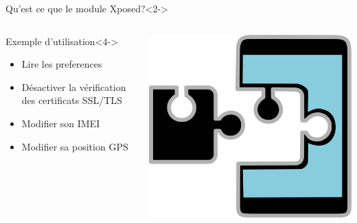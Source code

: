 \documentclass[aspectratio=1610, ]{beamer}%
\begin{document}
  \begin{frame}[t]
    \slidetitle[Xposed]
    \begin{block}{Qu'est ce que le module Xposed?}<2->
    \end{block}
    \begin{columns} 
      \begin{column}{0.7\linewidth}
        \begin{block}{Exemple d'utilisation}<4->
          \begin{itemize}
          \item<5-> Lire les preferences 
          \item<6-> Désactiver la vérification des certificats SSL/TLS
          \item<7-> Modifier son IMEI
          \item<8-> Modifier sa position GPS
          \end{itemize}
        \end{block}
      \end{column}
      \begin{column}{0.25\linewidth}
        \centering
        \includegraphics[width=0.9\linewidth]{img/xposed.png}
      \end{column}
    \end{columns}
  \end{frame}
\end{document}
